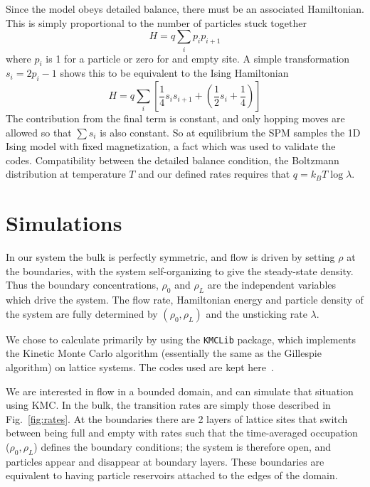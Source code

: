 \documentclass[
reprint, amsmath,amssymb,
]{revtex4-1}
\begin{document}
Since the model obeys detailed balance, there must be an associated
Hamiltonian.  This is simply proportional to the number of particles stuck together
\begin{equation}
 H = q \sum_i p_ip_{i+1}
\end{equation}
where $p_i$ is 1 for a particle or zero for and empty site.  A simple
transformation $s_i = 2p_i-1$ shows this to be equivalent to the Ising
Hamiltonian
\begin{equation}
 H = q \sum_i \left[ \frac{1}{4} s_i s_{i+1} + \left( \frac{1}{2} s_i + \frac{1}{4} \right) \right]
\end{equation}
The contribution from the final term is constant, and only hopping moves are allowed so that
$\sum s_i$ is also constant. So at equilibrium the SPM samples the 1D
Ising model with fixed magnetization, a fact which was used to
validate the codes. Compatibility between the detailed balance condition, the Boltzmann distribution at temperature $T$ and our defined rates requires that $q = k_B T\log{\lambda} $.


\section{Simulations}

 In our system the bulk is perfectly symmetric, and flow is driven by
 setting $\rho$ at the boundaries, with the system self-organizing to
 give the steady-state density. Thus the boundary concentrations,
 $\rho_0$ and $\rho_L$ are the independent variables which drive the
 system.  The flow rate, Hamiltonian energy and particle density of the system are fully determined by  $(\rho_0, \rho_L)$ and the unsticking rate $\lambda$.


  We chose to calculate primarily by using the \texttt{KMCLib}\cite{leetmaa2014kmclib}
 package, which implements the Kinetic Monte Carlo algorithm
 (essentially the same as the Gillespie algorithm\cite{Gillespie1977,
   Bortz1975, Prados1997}) on lattice systems. The codes used are kept
 here~\cite{jHellGitRepo}.

We are interested in flow in a bounded domain, and can simulate that
situation using KMC. In the bulk, the transition rates are simply
those described in Fig.~\ref{fig:rates}. At the boundaries there
are 2 layers of lattice sites that switch between being full and empty
with rates such that the time-averaged occupation ($\rho_0, \rho_L$)
defines the boundary conditions; the system is therefore open, and
particles appear and disappear at boundary layers.  These boundaries
are equivalent to having particle reservoirs attached to the edges of the
domain.
\end{document}
